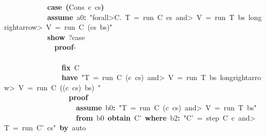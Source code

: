 \documentclass{article}
\newcommand{\syntaxKEYWORDA}[1]{\textcolor[rgb]{0.0,0.4,0.6}{\textbf{#1}}}
\newcommand{\syntaxKEYWORDB}[1]{\textcolor[rgb]{0.0,0.6,0.4}{\textbf{#1}}}
\newcommand{\syntaxKEYWORDC}[1]{\textcolor[rgb]{0.0,0.6,1.0}{\textbf{#1}}}
\newcommand{\syntaxLITERALA}[1]{\textcolor[rgb]{1.0,0.0,0.8}{#1}}
\newcommand{\syntaxOPERATOR}[1]{\textcolor[rgb]{0.0,0.0,0.0}{\textbf{#1}}}
\newcommand{\syntaxKEYWORDA}[1]{\textcolor[rgb]{0.0,0.4,0.6}{\textbf{#1}}}
\newcommand{\syntaxKEYWORDB}[1]{\textcolor[rgb]{0.0,0.6,0.4}{\textbf{#1}}}
\newcommand{\syntaxKEYWORDC}[1]{\textcolor[rgb]{0.0,0.6,1.0}{\textbf{#1}}}
\newcommand{\syntaxLITERALA}[1]{\textcolor[rgb]{1.0,0.0,0.8}{#1}}
\newcommand{\syntaxOPERATOR}[1]{\textcolor[rgb]{0.0,0.0,0.0}{\textbf{#1}}}
\newcommand{\syntaxKEYWORDA}[1]{\textcolor[rgb]{0.0,0.4,0.6}{\textbf{#1}}}
\newcommand{\syntaxKEYWORDB}[1]{\textcolor[rgb]{0.0,0.6,0.4}{\textbf{#1}}}
\newcommand{\syntaxKEYWORDC}[1]{\textcolor[rgb]{0.0,0.6,1.0}{\textbf{#1}}}
\newcommand{\syntaxLITERALA}[1]{\textcolor[rgb]{1.0,0.0,0.8}{#1}}
\newcommand{\syntaxOPERATOR}[1]{\textcolor[rgb]{0.0,0.0,0.0}{\textbf{#1}}}
\newcommand{\syntaxKEYWORDA}[1]{\textcolor[rgb]{0.0,0.4,0.6}{#1}}
\newcommand{\syntaxKEYWORDB}[1]{\textcolor[rgb]{0.0,0.6,0.4}{#1}}
\newcommand{\syntaxKEYWORDC}[1]{\textcolor[rgb]{0.0,0.6,1.0}{#1}}
\newcommand{\syntaxLITERALA}[1]{\textcolor[rgb]{1.0,0.0,0.8}{\textbf{#1}}}
\newcommand{\syntaxOPERATOR}[1]{\textcolor[rgb]{0.0,0.0,0.0}{#1}}
\newcommand{\syntaxKEYWORDA}[1]{\textcolor[rgb]{0.0,0.4,0.6}{\textbf{#1}}}
\newcommand{\syntaxKEYWORDB}[1]{\textcolor[rgb]{0.0,0.6,0.4}{\textbf{#1}}}
\newcommand{\syntaxKEYWORDC}[1]{\textcolor[rgb]{0.0,0.6,1.0}{\textbf{#1}}}
\newcommand{\syntaxLITERALA}[1]{\textcolor[rgb]{1.0,0.0,0.8}{#1}}
\newcommand{\syntaxOPERATOR}[1]{\textcolor[rgb]{0.0,0.0,0.0}{\textbf{#1}}}
\newcommand{\syntaxKEYWORDA}[1]{\textcolor[rgb]{0.0,0.4,0.6}{\textbf{#1}}}
\newcommand{\syntaxKEYWORDB}[1]{\textcolor[rgb]{0.0,0.6,0.4}{\textbf{#1}}}
\newcommand{\syntaxKEYWORDC}[1]{\textcolor[rgb]{0.0,0.6,1.0}{\textbf{#1}}}
\newcommand{\syntaxLITERALA}[1]{\textcolor[rgb]{1.0,0.0,0.8}{#1}}
\newcommand{\syntaxOPERATOR}[1]{\textcolor[rgb]{0.0,0.0,0.0}{\textbf{#1}}}
\begin{document}
{\ }{\ }{\ }{\ }{\ }{\ }{\ }{\ }{\ }{\ }{\ }{\ }\syntaxKEYWORDC{case}{\ }\syntaxOPERATOR{(}Cons{\ }c{\ }cs\syntaxOPERATOR{)}\hspace*{\fill}\\
{\ }{\ }{\ }{\ }{\ }{\ }{\ }{\ }{\ }{\ }{\ }{\ }\syntaxKEYWORDC{assume}{\ }a0\syntaxOPERATOR{:}{\ }\syntaxLITERALA{"\<forall>C.{\ }T{\ }={\ }run{\ }C{\ }cs{\ }\<and>{\ }V{\ }={\ }run{\ }T{\ }bs{\ }\<longrightarrow>{\ }V{\ }={\ }run{\ }C{\ }(cs{\ }\usebox{\atbox}{\ }bs)"}\hspace*{\fill}\\
{\ }{\ }{\ }{\ }{\ }{\ }{\ }{\ }{\ }{\ }{\ }{\ }\syntaxKEYWORDC{show}{\ }?case\hspace*{\fill}\\
{\ }{\ }{\ }{\ }{\ }{\ }{\ }{\ }{\ }{\ }{\ }{\ }{\ }{\ }\syntaxKEYWORDA{proof}{-}\hspace*{\fill}\\
{\ }{\ }{\ }{\ }{\ }{\ }{\ }{\ }{\ }{\ }{\ }{\ }{\ }{\ }\syntaxKEYWORDA{\usebox{\opencurlybracket}}\hspace*{\fill}\\
{\ }{\ }{\ }{\ }{\ }{\ }{\ }{\ }{\ }{\ }{\ }{\ }{\ }{\ }{\ }{\ }\syntaxKEYWORDC{fix}{\ }C\hspace*{\fill}\\
{\ }{\ }{\ }{\ }{\ }{\ }{\ }{\ }{\ }{\ }{\ }{\ }{\ }{\ }{\ }{\ }\syntaxKEYWORDA{have}{\ }\syntaxLITERALA{"T{\ }={\ }run{\ }C{\ }(c{\ }\usebox{\hashbox}{\ }cs){\ }\<and>{\ }V{\ }={\ }run{\ }T{\ }bs{\ }\<longrightarrow>{\ }V{\ }={\ }run{\ }C{\ }((c{\ }\usebox{\hashbox}{\ }cs){\ }\usebox{\atbox}{\ }bs){\ }"}\hspace*{\fill}\\
{\ }{\ }{\ }{\ }{\ }{\ }{\ }{\ }{\ }{\ }{\ }{\ }{\ }{\ }{\ }{\ }{\ }{\ }\syntaxKEYWORDA{proof}\hspace*{\fill}\\
{\ }{\ }{\ }{\ }{\ }{\ }{\ }{\ }{\ }{\ }{\ }{\ }{\ }{\ }{\ }{\ }{\ }{\ }{\ }{\ }\syntaxKEYWORDC{assume}{\ }b0\syntaxOPERATOR{:}{\ }\syntaxLITERALA{"T{\ }={\ }run{\ }C{\ }(c{\ }\usebox{\hashbox}{\ }cs){\ }\<and>{\ }V{\ }={\ }run{\ }T{\ }bs"}\hspace*{\fill}\\
{\ }{\ }{\ }{\ }{\ }{\ }{\ }{\ }{\ }{\ }{\ }{\ }{\ }{\ }{\ }{\ }{\ }{\ }{\ }{\ }\syntaxKEYWORDA{from}{\ }b0{\ }\syntaxKEYWORDC{obtain}{\ }C'{\ }\syntaxKEYWORDB{where}{\ }b2\syntaxOPERATOR{:}{\ }\syntaxLITERALA{"C'{\ }={\ }step{\ }C{\ }c{\ }\<and>{\ }T{\ }={\ }run{\ }C'{\ }cs"}{\ }\syntaxKEYWORDA{by}{\ }auto\hspace*{\fill}\\
\end{document}
